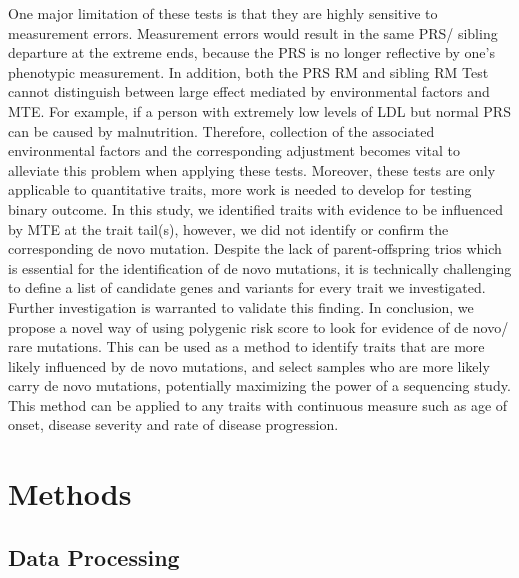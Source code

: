 \documentclass[times]{zHenriquesLab-StyleBioRxiv}
\begin{document}
One major limitation of these tests is that they are highly sensitive
to measurement errors. Measurement errors would result in the same
PRS/ sibling departure at the extreme ends, because the PRS is no
longer reflective by one’s phenotypic measurement. In addition, both
the PRS RM and sibling RM Test cannot distinguish between large effect
mediated by environmental factors and MTE. For example, if a person
with extremely low levels of LDL but normal PRS can be caused by
malnutrition.  Therefore, collection of the associated environmental
factors and the corresponding adjustment becomes vital to alleviate
this problem when applying these tests. Moreover, these tests are only
applicable to quantitative traits, more work is needed to develop for
testing binary outcome.  In this study, we identified traits with
evidence to be influenced by MTE at the trait tail(s), however, we did
not identify or confirm the corresponding de novo mutation. Despite
the lack of parent-offspring trios which is essential for the
identification of de novo mutations, it is technically challenging to
define a list of candidate genes and variants for every trait we
investigated. Further investigation is warranted to validate this
finding.  In conclusion, we propose a novel way of using polygenic
risk score to look for evidence of de novo/ rare mutations. This can
be used as a method to identify traits that are more likely influenced
by de novo mutations, and select samples who are more likely carry de
novo mutations, potentially maximizing the power of a sequencing
study. This method can be applied to any traits with continuous
measure such as age of onset, disease severity and rate of disease
progression.


\clearpage \newpage 
\section*{Methods} 
\subsection*{Data Processing} ~\\
\vspace*{-0.5cm} 
\end{document}
